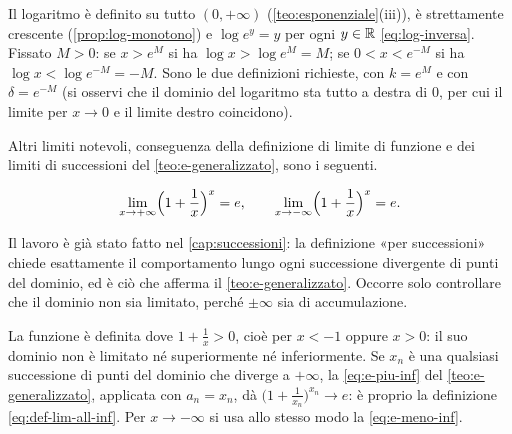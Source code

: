 \begin{dimostrazione}
Il logaritmo è definito su tutto $(0,+\infty)$ (\cref{teo:esponenziale}(iii)), è
strettamente crescente (\cref{prop:log-monotono}) e $\log e^{y}=y$ per ogni $y\in\mathbb{R}$
\eqref{eq:log-inversa}. Fissato $M>0$: se $x>e^{M}$ si ha $\log x>\log e^{M}=M$; se
$0<x<e^{-M}$ si ha $\log x<\log e^{-M}=-M$. Sono le due definizioni richieste, con
$k=e^{M}$ e con $\delta=e^{-M}$ (si osservi che il dominio del logaritmo sta tutto a
destra di $0$, per cui il limite per $x\to0$ e il limite destro coincidono).
\end{dimostrazione}

Altri limiti notevoli, conseguenza della definizione di limite di funzione e dei limiti
di successioni del \cref{teo:e-generalizzato}, sono i seguenti.

\begin{proposizione}\label{prop:e-funzioni}
\begin{equation}\label{eq:e-funzioni}
  \lim_{x\to+\infty}\Bigl(1+\frac1x\Bigr)^{x}=e, \qquad
  \lim_{x\to-\infty}\Bigl(1+\frac1x\Bigr)^{x}=e .
\end{equation}
\end{proposizione}

\begin{schema}
\end{schema}

\begin{strategia}
Il lavoro è già stato fatto nel \cref{cap:successioni}: la definizione «per
successioni» chiede esattamente il comportamento lungo ogni successione divergente di
punti del dominio, ed è ciò che afferma il \cref{teo:e-generalizzato}. Occorre solo
controllare che il dominio non sia limitato, perché $\pm\infty$ sia di accumulazione.
\end{strategia}

\begin{dimostrazione}
La funzione è definita dove $1+\frac1x>0$, cioè per $x<-1$ oppure $x>0$: il suo dominio
non è limitato né superiormente né inferiormente. Se $x_{n}$ è una qualsiasi successione
di punti del dominio che diverge a $+\infty$, la \eqref{eq:e-piu-inf} del
\cref{teo:e-generalizzato}, applicata con $a_{n}=x_{n}$, dà
$\bigl(1+\frac1{x_{n}}\bigr)^{x_{n}}\to e$: è proprio la definizione
\eqref{eq:def-lim-all-inf}. Per $x\to-\infty$ si usa allo stesso modo la
\eqref{eq:e-meno-inf}.
\end{dimostrazione}

